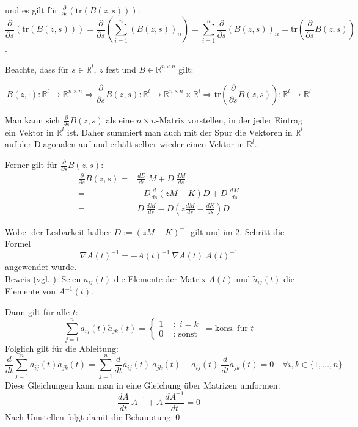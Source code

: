 \documentclass[a4paper,12pt]{report}
\newcommand{\R}{\mathbb R}
\newcommand{\klammer}[1]{\left(#1\right)}
\newcommand{\tr}{\text{tr}}
\newcommand{\inv}{^{-1}}
\newcommand{\1}{\mathds{1}}
\theoremstyle{plain} %
\theoremstyle{definition} %
\theoremstyle{remark}
\begin{document}
            und es gilt für $\frac{\partial}{\partial s} \klammer{\tr(B(z, s))}$:
            $$\frac{\partial}{\partial s} \klammer{\tr(B(z, s))} = \frac{\partial}{\partial s} \klammer{\sum_{i=1}^n (B(z, s))_{ii}} = \sum_{i=1}^n \frac{\partial}{\partial s} (B(z,s))_{ii} = \tr\klammer{\frac{\partial}{\partial s} B(z,s)}$$.

            Beachte, dass für $s\in \R^l$, $z$ fest und $B\in \R^{n\times n}$ gilt:

            $$B(z, \cdot): \R^l \to \R^{n\times n}\Rightarrow \frac{\partial}{\partial s} B(z, s) : \R^l\to \R^{n\times n}\times \R^l \Rightarrow \tr\klammer{\frac{\partial}{\partial s} B(z, s)}: \R^l \to \R^l$$

            Man kann sich $\frac{\partial}{\partial s} B(z, s)$ als eine $n\times n$-Matrix vorstellen, in der jeder Eintrag ein Vektor in $\R^l$ ist.
            Daher summiert man auch mit der Spur die Vektoren in $\R^l$ auf der Diagonalen auf und erhält selber wieder einen Vektor in $\R^l$.
            
            Ferner gilt für $\frac{\partial}{\partial s} B(z, s)$:
            \begin{align*}
                  \frac{\partial}{\partial s} B(z, s) =& \frac{dD}{ds} \ M + D \ \frac{dM}{ds}\\
                  =& - D \frac{d}{ds}(zM-K) D + D \ \frac{dM}{ds}\\
                  =& D \ \frac{dM}{ds} - D \klammer{z \frac{dM}{ds}-\frac{dK}{ds}} D
            \end{align*}

            Wobei der Lesbarkeit halber $D:=(zM-K)\inv$ gilt und im 2. Schritt die Formel
            $$\nabla A(t)\inv = -A(t)\inv\ \nabla A(t)\ A(t)\inv$$
            angewendet wurde.\\
            Beweis (vgl. \cite{derivativeInverseMatrix}):
            Seien $a_{ij}(t)$ die Elemente der Matrix $A(t)$ und $\widetilde{a}_{ij}(t)$ die Elemente von $A\inv(t)$.

            Dann gilt für alle $t$:
            $$\sum_{j=1}^{n} a_{ij}(t)\widetilde{a}_{jk}(t) =  \begin{cases}
                        1 & \text{ :  }\, i=k \\
                        0 & \text{ :  sonst } 
                        \end{cases} = \text{kons. für }t $$
            Folglich gilt für die Ableitung:
            $$\frac{d}{dt}\sum_{j=1}^{n} a_{ij}(t)\widetilde{a}_{jk}(t) = \sum_{j=1}^{n} \frac{d}{dt}a_{ij}(t)\ \widetilde{a}_{jk}(t)+a_{ij}(t)\ \frac{d}{dt}\widetilde{a}_{jk}(t) = 0 \quad \forall i,k\in\{1,\dots,n\}$$
            Diese Gleichungen kann man in eine Gleichung über Matrizen umformen:
            $$\frac{dA}{dt}\ A\inv + A\ \frac{dA\inv}{dt} = 0$$
            Nach Umstellen folgt damit die Behauptung.\qed
\end{document}
